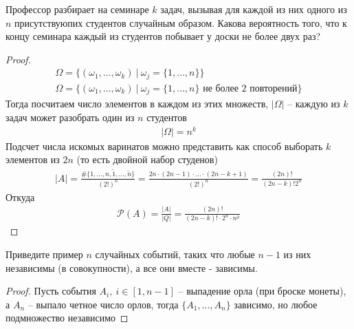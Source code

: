     \begin{prob}
        Профессор разбирает на семинаре $k$ задач, вызывая для каждой из них одного из $n$ присутствуюпих студентов случайным образом. Какова вероятность того, что к концу семинара каждый из студентов побывает у доски не более двух раз?
    \end{prob}
    \begin{proof}
        \begin{gather*}
            \Omega = \{(\omega_1, \ldots, \omega_k)\ |\ \omega_j = \{1, \ldots, n\} \}\\
            \Omega = \{(\omega_1, \ldots, \omega_k)\ |\ \omega_j = \{1, \ldots, n\} \text{ не более 2 повторений} \}
        \end{gather*}
        Тогда посчитаем число элементов в каждом из этих множеств, $|\Omega|$ -- каждую из $k$ задач может разобрать один из $n$ студентов
        \begin{gather*}
            |\Omega| = n^k
        \end{gather*}
        Подсчет числа искомых варинатов можно представить как способ выборать $k$ элементов из $2n$ (то есть двойной набор студенов)
        \begin{gather*}
            |A| = \frac{\# \{1, \ldots, n, \tilde{1}, \ldots, \tilde{n}\}}{(2!)^n}
            = \frac{2n \cdot (2n-1) \cdot \ldots \cdot (2n-k+1)}{(2!)^n}
            = \frac{(2n)!}{(2n-k)! 2^n}
        \end{gather*}
        Откуда
        \begin{gather*}
            \mathcal{P}(A) = \frac{|A|}{|Q|} = \frac{(2n)!}{(2n-k)! \cdot 2^n \cdot n^k}
        \end{gather*}
    \end{proof}
\vskip 0.6in


    \begin{prob}
        Приведите пример $n$ случайных событий, таких что любые $n-1$ из них независимы (в совокупности), а все они вместе - зависимы.
    \end{prob}
    \begin{proof}
        Пусть события $A_i,\ i \in [1, n-1]$ -- выпадение орла (при броске монеты), а $A_n$ -- выпало четное число орлов, тогда $\{A_1, \ldots, A_n\}$ зависимо, но любое подмножество независимо
    \end{proof}
\vskip 0.6in


